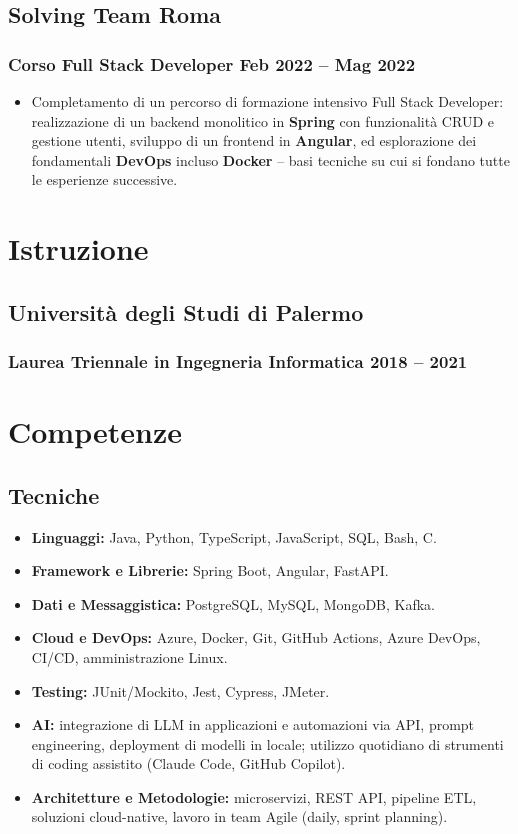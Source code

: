 \documentclass[11pt]{article}
\newcommand{\rside}[1]{
  \hfill {\normalfont\color{accent} #1}%
}
\begin{document}
\subsection{Solving Team \rside{Roma}}
\subsubsection{Corso Full Stack Developer \rside{Feb 2022 -- Mag 2022}}
\begin{itemize}
  \item Completamento di un percorso di formazione intensivo Full Stack Developer: realizzazione di un backend monolitico in \textbf{Spring} con funzionalità CRUD e gestione utenti, sviluppo di un frontend in \textbf{Angular}, ed esplorazione dei fondamentali \textbf{DevOps} incluso \textbf{Docker} -- basi tecniche su cui si fondano tutte le esperienze successive.
\end{itemize}

\section{Istruzione}
\subsection{Università degli Studi di Palermo}
\subsubsection{Laurea Triennale in Ingegneria Informatica \rside{2018 -- 2021}}
\vspace{1em}

\section{Competenze}
\subsection{Tecniche}
\begin{itemize}
  \item \textbf{Linguaggi:} Java, Python, TypeScript, JavaScript, SQL, Bash, C.
  \item \textbf{Framework e Librerie:} Spring Boot, Angular, FastAPI.
  \item \textbf{Dati e Messaggistica:} PostgreSQL, MySQL, MongoDB, Kafka.
  \item \textbf{Cloud e DevOps:} Azure, Docker, Git, GitHub Actions, Azure DevOps, CI/CD, amministrazione Linux.
  \item \textbf{Testing:} JUnit/Mockito, Jest, Cypress, JMeter.
  \item \textbf{AI:} integrazione di LLM in applicazioni e automazioni via API, prompt engineering, deployment di modelli in locale; utilizzo quotidiano di strumenti di coding assistito (Claude Code, GitHub Copilot).
  \item \textbf{Architetture e Metodologie:} microservizi, REST API, pipeline ETL, soluzioni cloud-native, lavoro in team Agile (daily, sprint planning).
\end{itemize}
\end{document}

